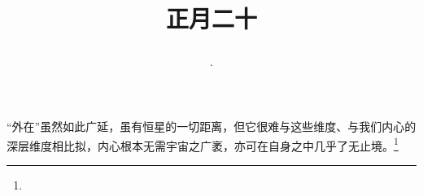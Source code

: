 \title{\date[d=29,m=2,y=2024][year:cn-y,年,month:cn,day:cn,日,·,weekday]·正月二十 }
“外在”虽然如此广延，虽有恒星的一切距离，但它很难与这些维度、与我们内心的深层维度相比拟，内心根本无需宇宙之广袤，亦可在自身之中几乎了无止境。\footnote{ }

